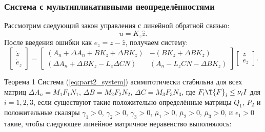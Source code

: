 \begin{frame}
	\frametitle{Система с мультипликативными неопределённостями}
	    Рассмотрим следующий закон управления с линейной обратной связью:
	\begin{equation}
		\label{eq:control_law}
		u={K}_z\hat{z}.
	\end{equation}
	После введения ошибки как $e_z=z-\hat{z}$, получаем систему:
	\begin{equation}
		\label{eq:part2_system}
		\begin{bmatrix}
			\dot{z} \\ \dot{e}_z
		\end{bmatrix}=\begin{bmatrix}
			({A}_n+\Delta {A}_n +{B}{K}_z+\Delta {B}{K}_z) & -({B}{K}_z+\Delta {B}{K}_z) \\
			(\Delta {A}_n +\Delta {B}{K}_z-{L}_z\Delta {C}{N}) & ({A}_n-{L}_z{C}{N}-\Delta {B}{K}_z)        \end{bmatrix}\begin{bmatrix}
			z \\ e_z
		\end{bmatrix}.
	\end{equation}
	\begin{block}{Теорема 1}
		Система (\ref{eq:part2_system}) асимптотически стабильна для всех матриц
		$\Delta {A}_n={M}_1{F}_1{N}_1$, 
		$\Delta {B}= {M}_2{F}_2{N}_2$, 
		$\Delta {C} = {M}_3{F}_3{N}_3$,
		где
		${F}_i\T{F}_i\leq \nu_i {I}$ для $i=1,2,3$,
		если существуют такие положительно определённые матрицы ${Q}_1$, ${P}_2$ и положительные скаляры
		$\gamma_1>0$, $\gamma_2>0$, $\gamma_3>0$, $\bar{\mu}_1>0$, $\bar{\mu}_2>0$, $\bar{\mu}_3>0$, и $\epsilon_1 > 0$ такие, чтобы следующее линейное матричное неравенство выполнялось:
	\end{block}
\end{frame}

